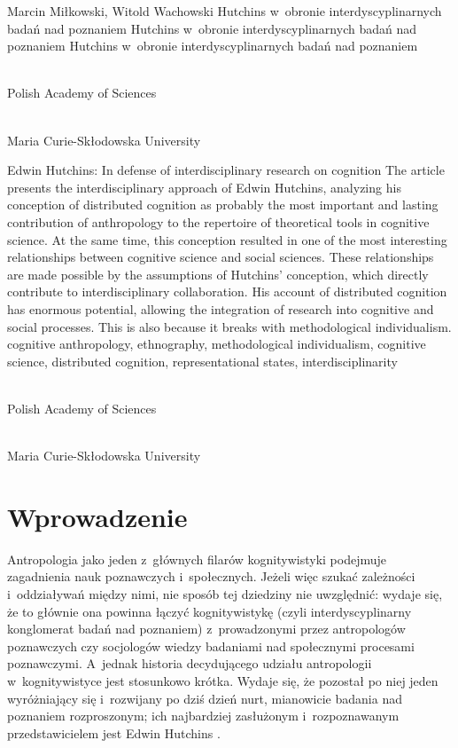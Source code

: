 \begin{artplenv2auth}{Marcin Miłkowski, Witold Wachowski}
	{Hutchins w~obronie interdyscyplinarnych badań nad poznaniem}
	{Hutchins w~obronie interdyscyplinarnych badań nad poznaniem}
	{Hutchins w~obronie interdyscyplinarnych badań nad poznaniem}
	{\flushright{}\\\subsubsectit\small{Polish Academy of Sciences}\par
		\flushright{}\\\subsubsectit\small{Maria Curie-Skłodowska University}\par}
	{Edwin Hutchins: In defense of interdisciplinary research on cognition}
	{The article presents the interdisciplinary approach of Edwin Hutchins, analyzing his conception of distributed cognition as probably the most important and lasting contribution of anthropology to the repertoire of theoretical tools in cognitive science. At the same time, this conception resulted in one of the most interesting relationships between cognitive science and social sciences. These relationships are made possible by the assumptions of Hutchins' conception, which directly contribute to interdisciplinary collaboration. His account of distributed cognition has enormous potential, allowing the integration of research into cognitive and social processes. This is also because it breaks with methodological individualism.}
	{cognitive anthropology, ethnography, methodological individualism, cognitive science, distributed cognition, representational states, interdisciplinarity}
		{\flushright{}\\\subsubsectit\small{Polish Academy of Sciences}\par
			\flushright{}\\\subsubsectit\small{Maria Curie-Skłodowska University}\par}
	
	


\section{Wprowadzenie}
\lettrine[loversize=0.13,lines=2,lraise=-0.01,nindent=0em,findent=0.2pt]%
{A}{}ntropologia jako jeden z~głównych filarów kognitywistyki podejmuje zagadnienia nauk poznawczych i~społecznych. Jeżeli więc szukać zależności i~oddziaływań między nimi, nie sposób tej dziedziny nie uwzględnić: wydaje się, że to głównie ona powinna łączyć kognitywistykę (czyli interdyscyplinarny konglomerat badań nad poznaniem) z~prowadzonymi przez antropologów poznawczych czy socjologów wiedzy badaniami nad społecznymi procesami poznawczymi. A~jednak historia decydującego udziału antropologii w~kognitywistyce jest stosunkowo krótka. Wydaje się, że pozostał po niej jeden wyróżniający się i~rozwijany po dziś dzień nurt, mianowicie badania nad poznaniem rozproszonym; ich najbardziej zasłużonym i~rozpoznawanym przedstawicielem jest Edwin Hutchins
\parencite*[][]{hutchins_hutchins_2022}.%





\end{artplenv2auth}
